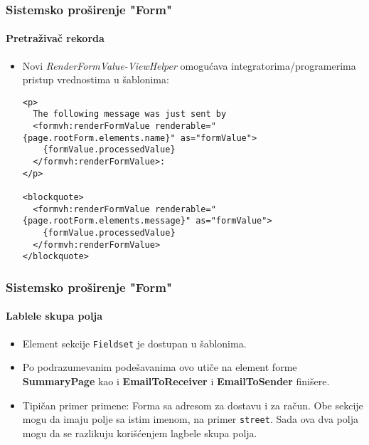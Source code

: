
\begin{frame}[fragile]
	\frametitle{Sistemsko proširenje "Form"}
	\framesubtitle{Pretraživač rekorda}

	\lstset{basicstyle=\tiny\ttfamily}

	\begin{itemize}
		\item Novi \textit{RenderFormValue-ViewHelper} omogućava integratorima/programerima pristup vrednostima u šablonima:
\begin{lstlisting}
<p>
  The following message was just sent by
  <formvh:renderFormValue renderable="{page.rootForm.elements.name}" as="formValue">
    {formValue.processedValue}
  </formvh:renderFormValue>:
</p>

<blockquote>
  <formvh:renderFormValue renderable="{page.rootForm.elements.message}" as="formValue">
    {formValue.processedValue}
  </formvh:renderFormValue>
</blockquote>
\end{lstlisting}

	\end{itemize}

\end{frame}


\begin{frame}[fragile]
	\frametitle{Sistemsko proširenje "Form"}
	\framesubtitle{Lablele skupa polja}

	\begin{itemize}
		\item Element sekcije \texttt{Fieldset} je dostupan u šablonima.
		\item Po podrazumevanim podešavanima ovo utiče na element forme \textbf{SummaryPage} kao i \textbf{EmailToReceiver} i \textbf{EmailToSender} finišere.
		\item Tipičan primer primene:\newline
			\small
				Forma sa adresom za dostavu i za račun. Obe sekcije mogu da imaju polje sa istim imenom, na primer \texttt{street}.
				Sada ova dva polja mogu da se razlikuju korišćenjem lagbele skupa polja.
			\normalsize

	\end{itemize}

\end{frame}

